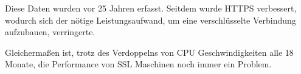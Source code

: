 \begin{table}[htpb]
    \caption[Parameter linearer Anpassungen an HTTP- und HTTPS-Übertragungen]{Parameter linearer Anpassungen an HTTP- und HTTPS-Übertragungen\footnotemark}
    \label{tab:HTTPS}
\end{table}
Diese Daten wurden vor 25 Jahren erfasst.
Seitdem wurde \ac{HTTPS} verbessert, wodurch sich der nötige Leistungsaufwand, um eine verschlüsselte Verbindung aufzubauen, verringerte.\autocite[\vglf][]{CloudfareWarumHTTPS:online}

Gleichermaßen ist, trotz des Verdoppelns von CPU Geschwindigkeiten alle 18 Monate, die Performance von \ac{SSL} Maschinen noch immer ein Problem.\autocite[\vglf][]{cryptoeprint:2006/212}

